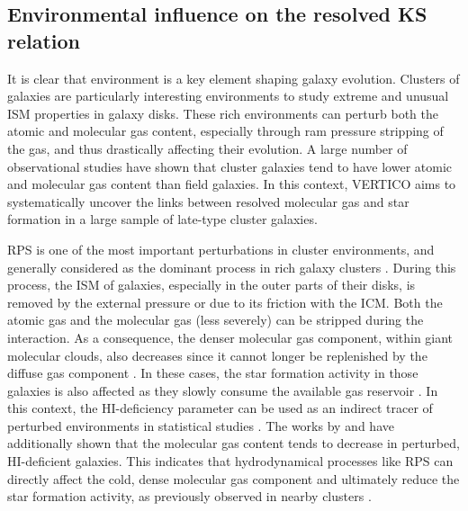 \documentclass[longauth]{aa}
\begin{document}
\subsection{Environmental influence on the resolved KS relation}

It is clear that environment is a key element shaping galaxy evolution. Clusters of galaxies are particularly interesting environments to study extreme and unusual ISM properties in galaxy disks. These rich environments can perturb both the atomic and molecular gas content, especially through ram pressure stripping of the gas, and thus drastically affecting their evolution. A large number of observational studies have shown that cluster galaxies tend to have lower atomic \citep[e.g.,][]{Haynes1984,Cayatte1990,Catinella2013} and molecular \citep[e.g.,][]{Fumagalli2009,Boselli2014} gas content than field galaxies. In this context, VERTICO aims to systematically uncover the links between resolved molecular gas and star formation in a large sample of late-type cluster galaxies.

RPS is one of the most important perturbations in cluster environments, and generally considered as the dominant process in rich galaxy clusters \citep[e.g.,][]{Vollmer2001,Boselli2006,Boselli2014b}. During this process, the ISM of galaxies, especially in the outer parts of their disks, is removed by the external pressure or due to its friction with the ICM. Both the atomic gas and the molecular gas (less severely) can be stripped during the interaction. As a consequence, the denser molecular gas component, within giant molecular clouds, also decreases since it cannot longer be replenished by the diffuse gas component \citep{Tonnesen2009}. In these cases, the star formation activity in those galaxies is also affected as they slowly consume the available gas reservoir \citep{Boselli2014}. In this context, the HI-deficiency parameter can be used as an indirect tracer of perturbed environments in statistical studies \citep[e.g.,][]{Haynes1984,Solanes2001,Gavazzi2005,Gavazzi2006,Catinella2013,Loni2021}. The works by \citet{Fumagalli2009} and \citet{Boselli2014} have additionally shown that the molecular gas content tends to decrease in perturbed, HI-deficient galaxies. This indicates that hydrodynamical processes like RPS can directly affect the cold, dense molecular gas component \citep{Wilson2009,Mok2016,Chung2017} and ultimately reduce the star formation activity, as previously observed in nearby clusters \citep[e.g.,][]{Kennicutt1983,Moss1993,Gavazzi2006,Haines2007,Vulcani2010}. 
\end{document}
